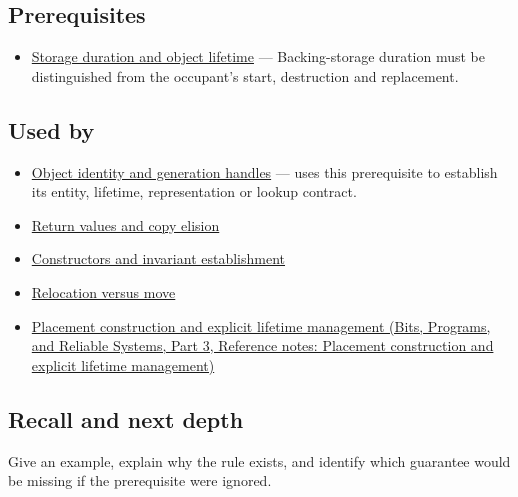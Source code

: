 \subsection{Prerequisites}\label{appendix-a82f9c438857-prerequisites}

\hypertarget{appendix-a82f9c438857-prerequisites}{}

\begin{itemize}
\tightlist
\item
  \hyperref[appendix-0b104bcba06b]{Storage duration and object lifetime} --- Backing-storage duration must be distinguished from the occupant's start, destruction and replacement.
\end{itemize}

\subsection{Used by}\label{appendix-a82f9c438857-used-by}

\hypertarget{appendix-a82f9c438857-used-by}{}

\begin{itemize}
\tightlist
\item
  \hyperref[appendix-f1581457d322]{Object identity and generation handles} --- uses this prerequisite to establish its entity, lifetime, representation or lookup contract.
\item
  \hyperref[appendix-b08d3788c5c6]{Return values and copy elision}
\item
  \hyperref[appendix-7f8ec83d0886]{Constructors and invariant establishment}
\item
  \hyperref[appendix-adfd6397af8d]{Relocation versus move}
\item
  \href{../01-Bits-Programs-and-Reliable-Systems-P03/main.pdf\#appendix-f56c3e43fd4e}{Placement construction and explicit lifetime management (Bits, Programs, and Reliable Systems, Part 3, Reference notes: Placement construction and explicit lifetime management)}
\end{itemize}

\subsection{Recall and next depth}\label{appendix-a82f9c438857-recall-and-next-depth}

\hypertarget{appendix-a82f9c438857-recall-and-next-depth}{}

Give an example, explain why the rule exists, and identify which guarantee would be missing if the prerequisite were ignored.

